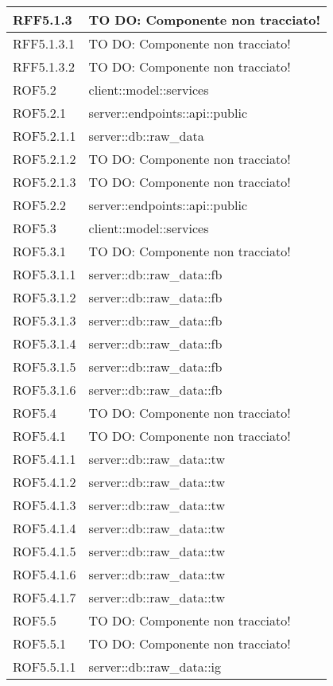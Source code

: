 \begin{center}
\begin{longtable}{| p{4cm} | p{8cm} |}
\hline
RFF5.1.3 & TO DO: Componente non tracciato! \\
\hline
RFF5.1.3.1 & TO DO: Componente non tracciato! \\
\hline
RFF5.1.3.2 & TO DO: Componente non tracciato! \\
\hline
ROF5.2 & client::model::services \\
\hline
ROF5.2.1 & server::endpoints::api::public \\
\hline
ROF5.2.1.1 & server::db::raw\_data \\
\hline
ROF5.2.1.2 & TO DO: Componente non tracciato! \\
\hline
ROF5.2.1.3 & TO DO: Componente non tracciato! \\
\hline
ROF5.2.2 & server::endpoints::api::public \\
\hline
ROF5.3 & client::model::services \\
\hline
ROF5.3.1 & TO DO: Componente non tracciato! \\
\hline
ROF5.3.1.1 & server::db::raw\_data::fb \\
\hline
ROF5.3.1.2 & server::db::raw\_data::fb \\
\hline
ROF5.3.1.3 & server::db::raw\_data::fb \\
\hline
ROF5.3.1.4 & server::db::raw\_data::fb \\
\hline
ROF5.3.1.5 & server::db::raw\_data::fb \\
\hline
ROF5.3.1.6 & server::db::raw\_data::fb \\
\hline
ROF5.4 & TO DO: Componente non tracciato! \\
\hline
ROF5.4.1 & TO DO: Componente non tracciato! \\
\hline
ROF5.4.1.1 & server::db::raw\_data::tw \\
\hline
ROF5.4.1.2 & server::db::raw\_data::tw \\
\hline
ROF5.4.1.3 & server::db::raw\_data::tw \\
\hline
ROF5.4.1.4 & server::db::raw\_data::tw \\
\hline
ROF5.4.1.5 & server::db::raw\_data::tw \\
\hline
ROF5.4.1.6 & server::db::raw\_data::tw \\
\hline
ROF5.4.1.7 & server::db::raw\_data::tw \\
\hline
ROF5.5 & TO DO: Componente non tracciato! \\
\hline
ROF5.5.1 & TO DO: Componente non tracciato! \\
\hline
ROF5.5.1.1 & server::db::raw\_data::ig \\

\end{longtable}
\end{center}
